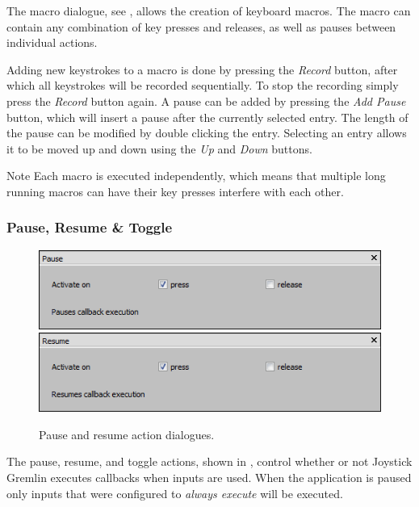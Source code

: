 \documentclass[a4, 10pt]{article}
\newcommand{\JG}{Joystick Gremlin}
\begin{document}
The macro dialogue, see , allows the creation of
keyboard macros. The macro can contain any combination of key presses
and releases, as well as pauses between individual actions.

Adding new keystrokes to a macro is done by pressing the \emph{Record}
button, after which all keystrokes will be recorded sequentially. To
stop the recording simply press the \emph{Record} button again. A pause
can be added by pressing the \emph{Add Pause} button, which will insert
a pause after the currently selected entry. The length of the pause can
be modified by double clicking the entry. Selecting an entry allows it
to be moved up and down using the \emph{Up} and \emph{Down} buttons.

\vspace{1em}
\begin{bclogo}[
    couleur=yellow!40,
    couleurBord=orange!80,
    couleurBarre=orange!80,
    arrondi=0.1,
    logo=\bcinfo
]{Note}
    Each macro is executed independently, which means that multiple long
    running macros can have their key presses interfere with each other.
\end{bclogo}


\subsubsection{Pause, Resume \& Toggle}

\begin{figure}[bt]
    \centering

    \includegraphics[width=0.75\linewidth]{images/action_pause}
    \includegraphics[width=0.75\linewidth]{images/action_resume}

    \caption{Pause and resume action dialogues.}
    \label{fig:action_pause_resume}
\end{figure}

The pause, resume, and toggle actions, shown in ,
control whether or not \JG{} executes callbacks when inputs are used.
When the application is paused only inputs that were configured to
\emph{always execute} will be executed.
\end{document}
